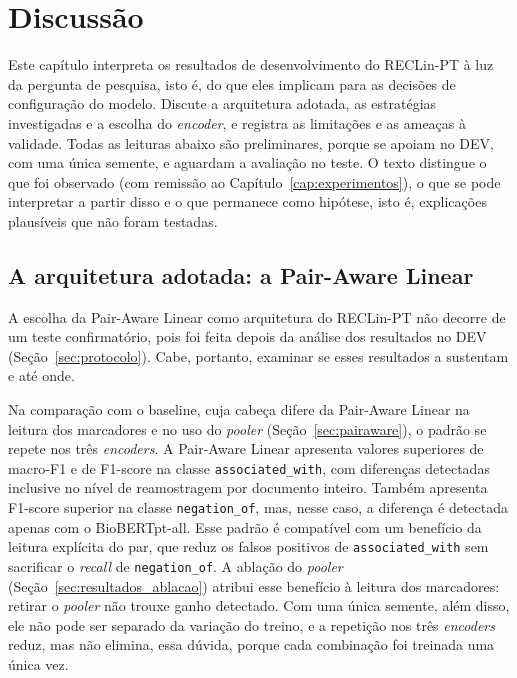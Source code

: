 \chapter[Discussão]{Discussão}
\label{cap:discussao}

Este capítulo interpreta os resultados de desenvolvimento do RECLin-PT à luz da
pergunta de pesquisa, isto é, do que eles implicam para as decisões de configuração do
modelo. Discute a arquitetura adotada, as estratégias investigadas e a escolha do
\emph{encoder}, e registra as limitações e as ameaças à validade. Todas as leituras
abaixo são preliminares, porque se apoiam no DEV, com uma única semente, e aguardam
a avaliação no teste. O texto distingue o que foi observado (com remissão ao
Capítulo~\ref{cap:experimentos}), o que se pode interpretar a partir disso e o que
permanece como hipótese, isto é, explicações plausíveis que não foram testadas.

\section{A arquitetura adotada: a Pair-Aware Linear}
\label{sec:discussao_estrategias}

A escolha da Pair-Aware Linear como arquitetura do RECLin-PT não decorre de um
teste confirmatório, pois foi feita depois da análise dos resultados no DEV
(Seção~\ref{sec:protocolo}). Cabe, portanto, examinar se esses resultados a
sustentam e até onde.

Na comparação com o baseline, cuja cabeça difere da Pair-Aware Linear na leitura dos marcadores e no uso do \emph{pooler} (Seção~\ref{sec:pairaware}), o padrão se repete nos três \emph{encoders}. A Pair-Aware Linear apresenta valores superiores de macro-F1 e de F1-score na classe \texttt{associated\_with}, com diferenças detectadas inclusive no nível de reamostragem por documento inteiro. Também apresenta F1-score superior na classe \texttt{negation\_of}, mas, nesse caso, a diferença é detectada apenas com o BioBERTpt-all. Esse padrão é compatível com um benefício da
leitura explícita do par, que reduz os falsos positivos de \texttt{associated\_with}
sem sacrificar o \emph{recall} de \texttt{negation\_of}. A ablação do \emph{pooler} (Seção~\ref{sec:resultados_ablacao}) atribui esse benefício à leitura dos marcadores: retirar o \emph{pooler} não trouxe ganho detectado. Com uma única semente, além disso,
ele não pode ser separado da variação do treino, e a repetição nos três
\emph{encoders} reduz, mas não elimina, essa dúvida, porque cada combinação foi
treinada uma única vez.

